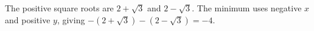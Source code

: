 The positive square roots are $ 2+\sqrt3 $ and $ 2-\sqrt3 $. The minimum uses negative $ x $ and positive $ y $, giving $-(2+\sqrt3)-(2-\sqrt3)=\boxed{-4}$.
